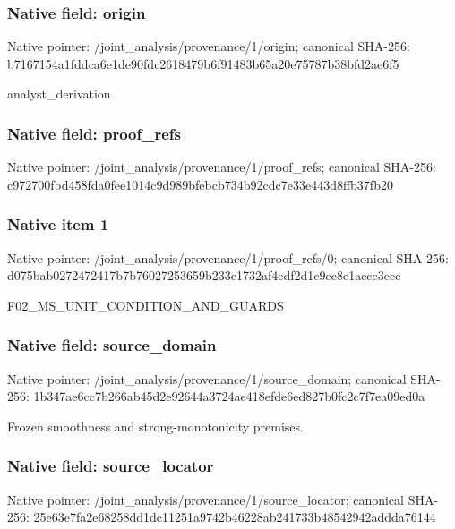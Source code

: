 \documentclass[10pt,a4paper]{article}
\begin{document}
\subsubsection{Native field: origin}
Native pointer: /joint\_\allowbreak{}analysis/provenance/1/origin; canonical SHA-256: b7167154a1fddca6e1de90fdc2618479b6f91483b65a20e75787b38bfd2ae6f5

\begingroup\raggedright\sloppy analyst\_\allowbreak{}derivation\par\endgroup

\subsubsection{Native field: proof\_\allowbreak{}refs}
Native pointer: /joint\_\allowbreak{}analysis/provenance/1/proof\_\allowbreak{}refs; canonical SHA-256: c972700fbd458fda0fee1014c9d989bfebcb734b92cdc7e33e443d8ffb37fb20

\subsubsection{Native item 1}
Native pointer: /joint\_\allowbreak{}analysis/provenance/1/proof\_\allowbreak{}refs/0; canonical SHA-256: d075bab0272472417b7b76027253659b233c1732af4edf2d1c9ec8e1aece3ece

\begingroup\raggedright\sloppy F02\_\allowbreak{}MS\_\allowbreak{}UNIT\_\allowbreak{}CONDITION\_\allowbreak{}AND\_\allowbreak{}GUARDS\par\endgroup

\subsubsection{Native field: source\_\allowbreak{}domain}
Native pointer: /joint\_\allowbreak{}analysis/provenance/1/source\_\allowbreak{}domain; canonical SHA-256: 1b347ae6cc7b266ab45d2e92644a3724ae418efde6ed827b0fc2c7f7ea09ed0a

\begingroup\raggedright\sloppy Frozen smoothness and strong-monotonicity premises.\par\endgroup

\subsubsection{Native field: source\_\allowbreak{}locator}
Native pointer: /joint\_\allowbreak{}analysis/provenance/1/source\_\allowbreak{}locator; canonical SHA-256: 25e63e7fa2e68258dd1dc11251a9742b46228ab241733b48542942addda76144
\end{document}
